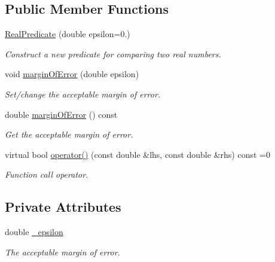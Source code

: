 \subsection*{\-Public \-Member \-Functions}
\begin{DoxyCompactItemize}
\item 
\hyperlink{classmetrobotics_1_1RealPredicate_a56f52c6bee2c9bfdc83e5ea1cc6aec9f}{\-Real\-Predicate} (double epsilon=0.)
\begin{DoxyCompactList}\small\item\em \-Construct a new predicate for comparing two real numbers. \end{DoxyCompactList}\item 
void \hyperlink{classmetrobotics_1_1RealPredicate_a09d002e141d2f679026358bd5db14335}{margin\-Of\-Error} (double epsilon)
\begin{DoxyCompactList}\small\item\em \-Set/change the acceptable margin of error. \end{DoxyCompactList}\item 
double \hyperlink{classmetrobotics_1_1RealPredicate_ae0a006ff2060f415223c28be23e1cfa7}{margin\-Of\-Error} () const 
\begin{DoxyCompactList}\small\item\em \-Get the acceptable margin of error. \end{DoxyCompactList}\item 
virtual bool \hyperlink{classmetrobotics_1_1RealPredicate_aff9d2e8629a14fcf743ff36c221e08bd}{operator()} (const double \&lhs, const double \&rhs) const =0
\begin{DoxyCompactList}\small\item\em \-Function call operator. \end{DoxyCompactList}\end{DoxyCompactItemize}
\subsection*{\-Private \-Attributes}
\begin{DoxyCompactItemize}
\item 
double \hyperlink{classmetrobotics_1_1RealPredicate_ac7eba7d852b56056478f69bca3ce5cf3}{\-\_\-epsilon}
\begin{DoxyCompactList}\small\item\em \-The acceptable margin of error. \end{DoxyCompactList}\end{DoxyCompactItemize}


